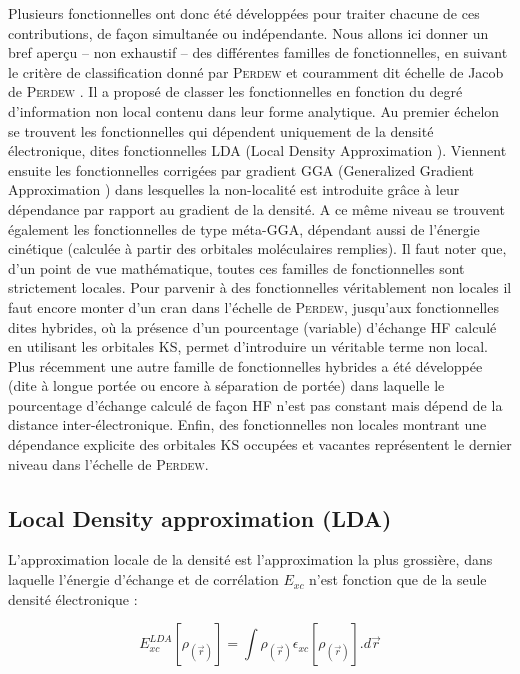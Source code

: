 Plusieurs fonctionnelles ont donc été développées pour traiter chacune de ces contributions, de façon simultanée ou indépendante. Nous allons ici donner un bref aperçu -- non exhaustif -- des différentes familles de fonctionnelles, en suivant le critère de classification donné par \textsc{Perdew} et couramment dit \og échelle de Jacob de \textsc{Perdew} \fg{}. Il a proposé de classer les fonctionnelles en fonction du degré d’information non local contenu dans leur forme analytique. Au premier échelon se trouvent les fonctionnelles qui dépendent uniquement de la densité électronique, dites fonctionnelles LDA (\og Local Density Approximation \fg{}). Viennent ensuite les fonctionnelles corrigées par gradient GGA (\og Generalized Gradient Approximation \fg{}) dans lesquelles la non-localité est introduite grâce à leur dépendance par rapport au gradient de la densité. A ce même niveau se trouvent également les fonctionnelles de type méta-GGA, dépendant aussi de l’énergie cinétique (calculée à partir des orbitales moléculaires remplies). Il faut noter que, d’un point de vue mathématique, toutes ces familles de fonctionnelles sont strictement locales. Pour parvenir à des fonctionnelles véritablement non locales il faut encore monter d’un cran dans l’échelle de \textsc{Perdew}, jusqu’aux fonctionnelles dites hybrides, où la présence d’un pourcentage (variable) d’échange HF calculé en utilisant les orbitales KS, permet d’introduire un véritable terme non local. Plus récemment une autre famille de fonctionnelles hybrides a été développée (dite à longue portée ou encore à séparation de portée) dans laquelle le pourcentage d’échange calculé de façon HF n’est pas constant mais dépend de la distance inter-électronique. Enfin, des fonctionnelles non locales montrant une dépendance explicite des orbitales KS occupées et vacantes représentent le dernier niveau dans l’échelle de \textsc{Perdew}.

\subsection{Local Density approximation (LDA)}\label{lda}

L’approximation locale de la densité est l’approximation la plus grossière, dans laquelle l’énergie d’échange et de corrélation $E_{xc}$ n’est fonction que de la seule densité électronique :

\begin{equation}
E_{xc}^{LDA}[\rho_{(\vec{r})}] = \int \rho_{(\vec{r})} \epsilon_{xc}[\rho_{(\vec{r})}].d\vec{r}
\end{equation}

